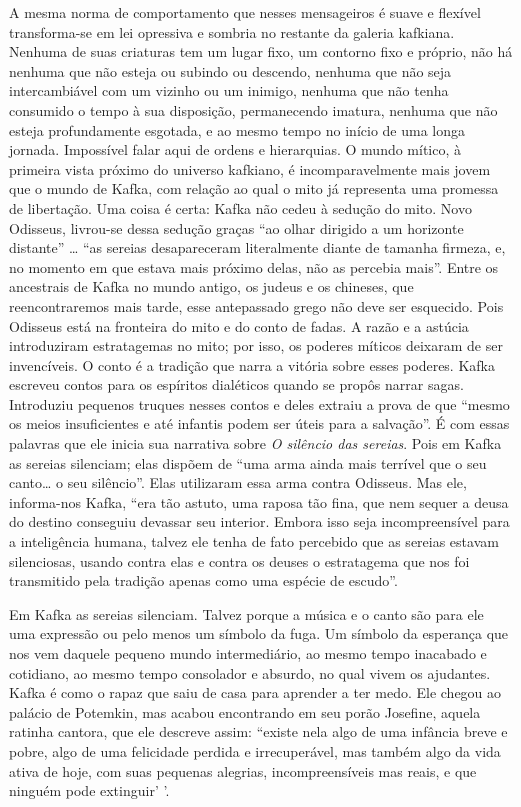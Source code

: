 A mesma norma de comportamento que nesses mensageiros é suave e flexível
transforma-se em lei opressiva e sombria no restante da galeria
kafkiana. Nenhuma de suas criaturas tem um lugar fixo, um contorno fixo
e próprio, não há nenhuma que não esteja ou subindo ou descendo, nenhuma
que não seja intercambiável com um vizinho ou um inimigo, nenhuma que
não tenha consumido o tempo à sua disposição, permanecendo imatura,
nenhuma que não esteja profundamente esgotada, e ao mesmo tempo no
início de uma longa jornada. Impossível falar aqui de ordens e
hierarquias. O mundo mítico, à primeira vista próximo do universo
kafkiano, é incomparavelmente mais jovem que o mundo de Kafka, com
relação ao qual o mito já representa uma promessa de libertação. Uma
coisa é certa: Kafka não cedeu à sedução do mito. Novo Odisseus,
livrou-se dessa sedução graças ``ao olhar dirigido a um horizonte
distante'' \ldots{} ``as sereias desapareceram literalmente diante de tamanha
firmeza, e, no momento em que estava mais próximo delas, não as percebia
mais''. Entre os ancestrais de Kafka no mundo antigo, os judeus e os
chineses, que reencontraremos mais tarde, esse antepassado grego não
deve ser esquecido. Pois Odisseus está na fronteira do mito e do conto
de fadas. A razão e a astúcia introduziram estratagemas no mito; por
isso, os poderes míticos deixaram de ser invencíveis. O conto é a
tradição que narra a vitória sobre esses poderes. Kafka escreveu contos
para os espíritos dialéticos quando se propôs narrar sagas. Introduziu
pequenos truques nesses contos e deles extraiu a prova de que ``mesmo os
meios insuficientes e até infantis podem ser úteis para a salvação''. É
com essas palavras que ele inicia sua narrativa sobre \textit{O silêncio das
sereias}. Pois em Kafka as sereias silenciam; elas dispõem de ``uma arma
ainda mais terrível que o seu canto\ldots{} o seu silêncio''. Elas utilizaram
essa arma contra Odisseus. Mas ele, informa-nos Kafka, ``era tão astuto,
uma raposa tão fina, que nem sequer a deusa do destino conseguiu
devassar seu interior. Embora isso seja incompreensível para a
inteligência humana, talvez ele tenha de fato percebido que as sereias
estavam silenciosas, usando contra elas e contra os deuses o estratagema
que nos foi transmitido pela tradição apenas como uma espécie de
escudo''.

Em Kafka as sereias silenciam. Talvez porque a música e o canto são para
ele uma expressão ou pelo menos um símbolo da fuga. Um símbolo da
esperança que nos vem daquele pequeno mundo intermediário, ao mesmo
tempo inacabado e cotidiano, ao mesmo tempo consolador e absurdo, no
qual vivem os ajudantes. Kafka é como o rapaz que saiu de casa para
aprender a ter medo. Ele chegou ao palácio de Potemkin, mas acabou
encontrando em seu porão Josefine, aquela ratinha cantora, que ele
descreve assim: ``existe nela algo de uma infância breve e pobre, algo
de uma felicidade perdida e irrecuperável, mas também algo da vida ativa
de hoje, com suas pequenas alegrias, incompreensíveis mas reais, e que
ninguém pode extinguir' '.

